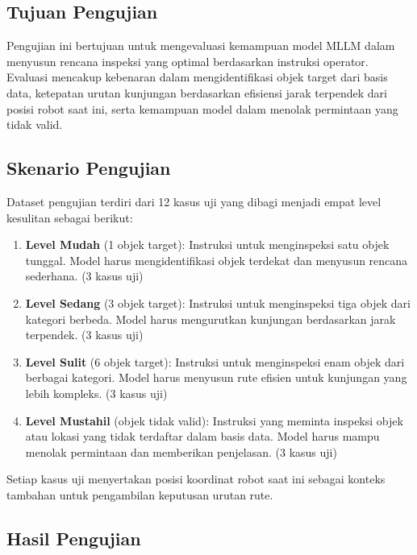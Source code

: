 \subsection{Tujuan Pengujian}
Pengujian ini bertujuan untuk mengevaluasi kemampuan model MLLM dalam menyusun rencana inspeksi yang optimal berdasarkan instruksi operator. Evaluasi mencakup kebenaran dalam mengidentifikasi objek target dari basis data, ketepatan urutan kunjungan berdasarkan efisiensi jarak terpendek dari posisi robot saat ini, serta kemampuan model dalam menolak permintaan yang tidak valid.

\subsection{Skenario Pengujian}
Dataset pengujian terdiri dari 12 kasus uji yang dibagi menjadi empat level kesulitan sebagai berikut:

\begin{enumerate}
    \item \textbf{Level Mudah} (1 objek target): Instruksi untuk menginspeksi satu objek tunggal. Model harus mengidentifikasi objek terdekat dan menyusun rencana sederhana. (3 kasus uji)
    \item \textbf{Level Sedang} (3 objek target): Instruksi untuk menginspeksi tiga objek dari kategori berbeda. Model harus mengurutkan kunjungan berdasarkan jarak terpendek. (3 kasus uji)
    \item \textbf{Level Sulit} (6 objek target): Instruksi untuk menginspeksi enam objek dari berbagai kategori. Model harus menyusun rute efisien untuk kunjungan yang lebih kompleks. (3 kasus uji)
    \item \textbf{Level Mustahil} (objek tidak valid): Instruksi yang meminta inspeksi objek atau lokasi yang tidak terdaftar dalam basis data. Model harus mampu menolak permintaan dan memberikan penjelasan. (3 kasus uji)
\end{enumerate}

Setiap kasus uji menyertakan posisi koordinat robot saat ini sebagai konteks tambahan untuk pengambilan keputusan urutan rute.

\subsection{Hasil Pengujian}

